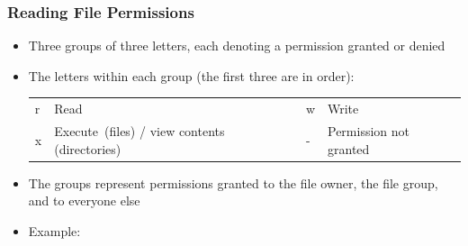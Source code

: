 \documentclass[hyperref,pdfa,unicode,utf8,usepdftitle]{beamer}
\begin{document}
\begin{frame}
  \frametitle{Reading File Permissions}
  \begin{itemize}
  \item Three groups of three letters, each denoting a permission
    granted or denied
  \item The letters within each group (the first three are in order):
      \begin{tabular}{l>{\RaggedRight\arraybackslash\noindent}p{4cm}l>{\RaggedRight\arraybackslash\noindent}p{4cm}}
      r & Read & w & Write \\
      x & {Execute~(files)} / view contents (directories) & - & Permission not granted
    \end{tabular}
  \item The groups represent permissions granted to the file owner,
    the file group, and to everyone else
  \item Example:

  \end{itemize}
\end{frame}
\end{document}
